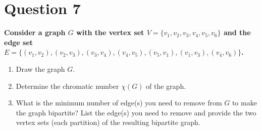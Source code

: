\documentclass[11pt]{article}
\begin{document}
    \clearpage
\section*{Question 7}

    \textbf{Consider a graph $G$ with the vertex set $V=\{v_1, v_2, v_3, v_4, v_5, v_6\}$ and the edge set $E=\{(v_1, v_2), (v_2, v_3), (v_3, v_4), (v_4, v_5), (v_5, v_1), (v_1, v_3), (v_4, v_6)\}$.}
    \begin{enumerate}[label=(\alph*)]
        \item Draw the graph $G$.
        \item Determine the chromatic number $\chi(G)$ of the graph.
        \item What is the minimum number of edge(s) you need to remove from $G$ to make the graph bipartite? List the edge(s) you need to remove and provide the two vertex sets (each partition) of the resulting bipartite graph.
    \end{enumerate}
\end{document}
